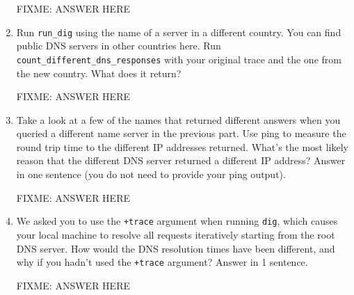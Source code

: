 \documentclass[10pt]{article}
\begin{document}
\begin{enumerate}
FIXME: ANSWER HERE

\item Run \texttt{run\_dig} using the name of a server in a different country. You can find public DNS servers in other countries here. 
Run \texttt{count\_different\_dns\_responses} with your original trace and the one from the new country. What does it return?

FIXME: ANSWER HERE

\item Take a look at a few of the names that returned different answers when you queried a different name server in the previous part. Use ping to measure the round trip time to the different IP addresses returned. What's the most likely reason that the different DNS server returned a different IP address? Answer in one sentence (you do not need to provide your ping output).

FIXME: ANSWER HERE

\item We asked you to use the \texttt{+trace} argument when running \texttt{dig}, which causes your local machine to resolve all requests iteratively starting from the root DNS server. How would the DNS resolution times have been different, and why if you hadn't used the \texttt{+trace} argument? Answer in 1 sentence.

FIXME: ANSWER HERE

\end{enumerate}
\end{document}
